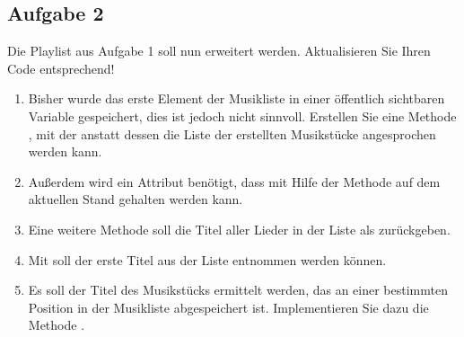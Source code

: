 \documentclass{lehramt-informatik-haupt}
\begin{document}
\subsection{Aufgabe 2}

Die Playlist aus Aufgabe 1 soll nun erweitert werden. Aktualisieren Sie
Ihren Code entsprechend!

\begin{enumerate}

%

\item Bisher wurde das erste Element der Musikliste in einer öffentlich
sichtbaren Variable gespeichert, dies ist jedoch nicht sinnvoll.
Erstellen Sie eine Methode , mit der anstatt dessen
die Liste der erstellten Musikstücke angesprochen werden kann.

\begin{antwort}
\end{antwort}

%

\item Außerdem wird ein Attribut  benötigt, dass mit Hilfe
der Methode  auf dem aktuellen Stand
gehalten werden kann.

\begin{antwort}
\end{antwort}

%

\item Eine weitere Methode  soll die Titel
aller Lieder in der Liste als  zurückgeben.

\begin{antwort}
\end{antwort}

%

\item Mit  soll der erste Titel aus der Liste
entnommen werden können.

\begin{antwort}
\end{antwort}

%

\item Es soll der Titel des Musikstücks ermittelt werden, das an einer
bestimmten Position in der Musikliste abgespeichert ist. Implementieren
Sie dazu die Methode .


\end{enumerate}
\end{document}
